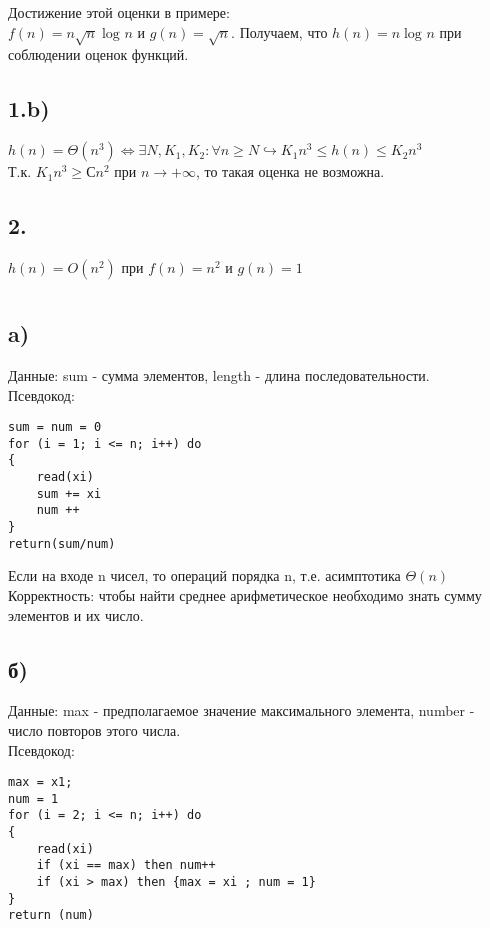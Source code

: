\documentclass[a4paper,12pt]{article} %
\begin{document}
Достижение этой оценки в примере:\\
$f(n) = n\sqrt{n}\log_{}{n}$ и $
g(n) = \sqrt{n}$. Получаем, что $h(n) =n\log_{}{n}$ при соблюдении оценок функций.



\subsection*{1.b)}
$h(n)= \Theta(n^{3})\Leftrightarrow \exists N,K_{1},K_{2}:\forall n \geqslant N \hookrightarrow K_{1}n^{3}\leqslant h(n) \leqslant K_{2}n^{3}
$\\
Т.к. \hspace{5pt}
$ K_{1}n^{3}\geqslant Сn^{2}$ при $n \to +\infty$, то
такая оценка не возможна.

\subsection*{2.}
$h(n)= O(n^{2})$ при $f(n)= n^{2}$ и $g(n)=1$\\



\section{}
\subsection*{a)}
Данные: sum - сумма элементов, length - длина последовательности.\\
Псевдокод:\\
\begin{lstlisting}
sum = num = 0
for (i = 1; i <= n; i++) do
{
	read(xi)
	sum += xi
	num ++
}
return(sum/num)
\end{lstlisting}

Если на входе n чисел, то операций порядка n, т.е. асимптотика $ \Theta(n)$\\
Корректность: чтобы найти среднее арифметическое необходимо знать сумму элементов и их число.


\subsection*{б)}
Данные: max - предполагаемое значение максимального элемента, number - число повторов этого числа.\\
Псевдокод:\\
\begin{lstlisting}
max = x1;
num = 1
for (i = 2; i <= n; i++) do
{
	read(xi)
	if (xi == max) then num++
	if (xi > max) then {max = xi ; num = 1} 
}
return (num)
\end{lstlisting}
\end{document}
